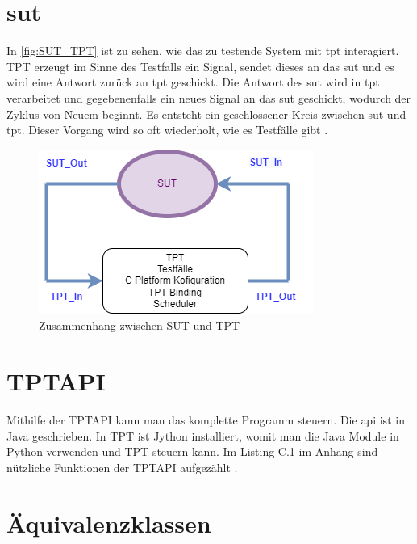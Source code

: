 \section*{\ac{sut}}
In \autoref{fig:SUT_TPT} ist zu sehen, wie das zu testende System mit \ac{tpt} interagiert.
TPT erzeugt im Sinne des Testfalls ein Signal, sendet dieses an das \ac{sut} und
es wird eine Antwort zurück an \ac{tpt} geschickt.
Die Antwort des \ac{sut} wird in \ac{tpt} verarbeitet und gegebenenfalls ein neues Signal an das \ac{sut} geschickt,
wodurch der Zyklus von Neuem beginnt. Es entsteht ein geschlossener Kreis zwischen \ac{sut} und \ac{tpt}.
Dieser Vorgang wird so oft wiederholt, wie es Testfälle gibt \cite[vgl.][]{tptsut}.%
\begin{figure}[h]
\centering
\includegraphics[scale=0.9,]{Bilder/Quicktest/SUT_TPT.drawio.png}
\caption{Zusammenhang zwischen SUT und TPT \cite{tptsut}}\label{fig:SUT_TPT}
\end{figure}

\section*{TPTAPI}
Mithilfe der TPTAPI kann man das komplette Programm steuern. Die \ac{api} ist in Java geschrieben.
In TPT ist Jython installiert, womit man die Java Module in Python verwenden und TPT steuern kann.
Im Listing C.1 im Anhang sind nützliche Funktionen der TPTAPI aufgezählt \cite[vgl.][S. 64 f.]{userguide}.

\section*{Äquivalenzklassen}
	